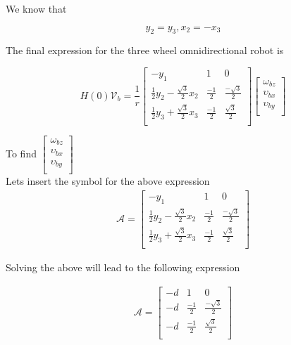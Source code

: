 \documentclass[12pt, twoside]{report}
\begin{document}
We know that

\begin{equation}
    y_2 = y_3,  x_2 = -x_3
\end{equation}

The final expression for the three wheel omnidirectional robot is

\begin{equation}
    H(0)\mathcal{V}_b = \frac{1}{r}
    \begin{bmatrix}
        -y_1                                   & 1            & 0                    \\
        \frac{1}{2}y_2 - \frac{\sqrt{3}}{2}x_2 & \frac{-1}{2} & \frac{- \sqrt{3}}{2} \\
        \frac{1}{2}y_3 + \frac{\sqrt{3}}{2}x_3 & \frac{-1}{2} & \frac{ \sqrt{3}}{2}  \\
    \end{bmatrix}
    \begin{bmatrix}
        \omega_{bz}   \\
        \upsilon_{bx} \\
        \upsilon_{by} \\
    \end{bmatrix}
\end{equation}

To find
$
    \begin{bmatrix}
        \omega_{bz}   \\
        \upsilon_{bx} \\
        \upsilon_{by} \\
    \end{bmatrix}
$\\

Lets insert the symbol for the above expression
\begin{align}
    \mathcal{A}  =
    \begin{bmatrix}
        -y_1                                   & 1            & 0                    \\
        \frac{1}{2}y_2 - \frac{\sqrt{3}}{2}x_2 & \frac{-1}{2} & \frac{- \sqrt{3}}{2} \\
        \frac{1}{2}y_3 + \frac{\sqrt{3}}{2}x_3 & \frac{-1}{2} & \frac{ \sqrt{3}}{2}  \\
    \end{bmatrix}
\end{align}

Solving the above will lead to the following expression

\begin{align}
    \mathcal{A} =
    \begin{bmatrix}
        -d & 1            & 0                    \\
        -d & \frac{-1}{2} & \frac{- \sqrt{3}}{2} \\
        -d & \frac{-1}{2} & \frac{\sqrt{3}}{2}   \\
    \end{bmatrix}
\end{align}
\end{document}
